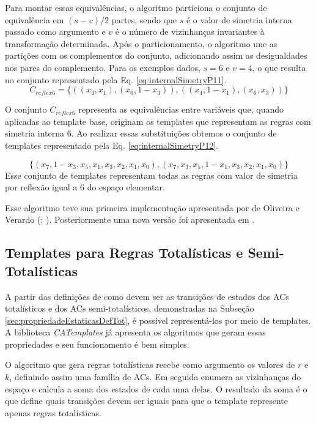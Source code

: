 Para montar essas equivalências, o algoritmo particiona o conjunto de equivalência em $(s-v)/2$ partes, sendo que $s$ é o valor de simetria interna passado como argumento e $v$ é o número de vizinhanças invariantes à transformação determinada. Após o particionamento, o algoritmo une as partições com os complementos do conjunto, adicionando assim as desigualdades nos pares do complemento. Para os exemplos dados, $s=6$ e $v=4$, o que resulta no conjunto representado pela Eq. \eqref{eq:internalSimetryP11}.
\begin{equation}
C_{reflex6}=\{((x_4,x_1),(x_6,1-x_3)),((x_4,1-x_1),(x_6,x_3))\}
\label{eq:internalSimetryP11}
\end{equation}

O conjunto $C_{reflex6}$ representa as equivalências entre variáveis que, quando aplicadas ao template base, originam os templates que representam as regras com simetria interna 6. Ao realizar essas substituições obtemos o conjunto de templates representado pela Eq. \eqref{eq:internalSimetryP12}.

\begin{equation}
\{(x_7,1-x_3,x_5,x_1,x_3,x_2,x_1,x_0),(x_7,x_3,x_5,1-x_1,x_3,x_2,x_1,x_0)\}
\label{eq:internalSimetryP12}
\end{equation}
Esse conjunto de templates representam todas as regras com valor de simetria por reflexão igual a 6 do espaço elementar.

Esse algoritmo teve sua primeira implementação apresentada por de Oliveira e Verardo (\citeyear{deOliveira2014}; \citeyear{deOliveira2014b}). Posteriormente uma nova versão foi apresentada em \cite{Verardo2014}.

\subsection{Templates para Regras Totalísticas e Semi-Totalísticas}
A partir das definições de como devem ser as transições de estados dos ACs totalísticos e dos ACs semi-totalísticos, demonstradas na Subseção \ref{sec:propriedadeEstaticasDefTot}, é possível representá-los por meio de templates. A biblioteca \textit{CATemplates} já apresenta os algoritmos que geram essas propriedades e seu funcionamento é bem simples. 

O algoritmo que gera regras totalísticas recebe como argumento os valores de $r$ e $k$, definindo assim uma família de ACs. Em seguida enumera as vizinhanças do espaço e calcula a soma dos estados de cada uma delas. O resultado da soma é o que define quais transições devem ser iguais para que o template represente apenas regras totalísticas.

